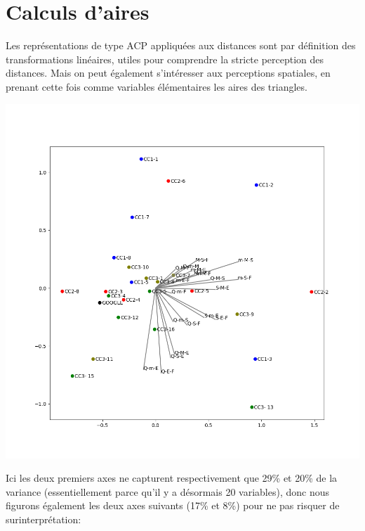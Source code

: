 \documentclass[a4paper]{article}
\begin{document}
\section{Calculs d'aires}

Les représentations de type ACP appliquées aux distances sont par définition des transformations linéaires, utiles pour comprendre la stricte perception des distances. Mais on peut également s'intéresser aux perceptions spatiales, en prenant cette fois comme variables élémentaires les aires des triangles. 

\includegraphics[scale=0.6]{PCA_aires_axes0-1.png}

Ici les deux premiers axes ne capturent respectivement que 29\% et 20\% de la variance (essentiellement parce qu'il y a désormais 20 variables), donc nous figurons également les deux axes suivants (17\% et 8\%) pour ne pas risquer de surinterprétation:
\end{document}
